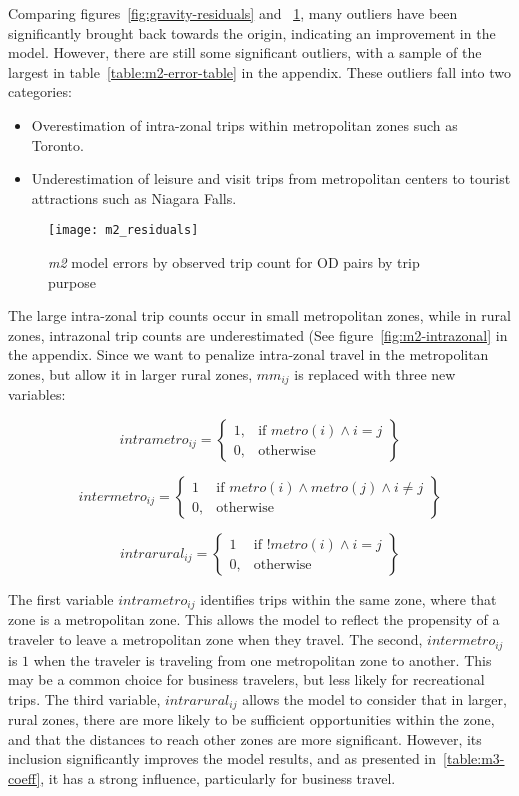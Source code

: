 Comparing figures~\ref{fig:gravity-residuals} and ~\ref{fig:m2_residuals}, many outliers have been significantly brought back towards the origin, indicating an improvement in the model. However, there are still some significant outliers, with a sample of the largest in table~\ref{table:m2-error-table} in the appendix. These outliers fall into two categories:
\begin{itemize}
\item Overestimation of intra-zonal trips within metropolitan zones such as Toronto.
\item Underestimation of leisure and visit trips from metropolitan centers to tourist attractions such as Niagara Falls.
\end{itemize}

\begin{figure}[H]
\centering
\texttt{[image: m2\_residuals]}
\caption{\textit{m2} model errors by observed trip count for OD pairs by trip purpose}
\label{fig:m2_residuals}
\end{figure}

The large intra-zonal trip counts occur in small metropolitan zones, while in rural zones, intrazonal trip counts are underestimated (See figure~\ref{fig:m2-intrazonal} in the appendix. Since we want to penalize intra-zonal travel in the metropolitan zones, but allow it in larger rural zones, $mm_{ij}$  is replaced with three new variables:

	$$	
	intrametro_{ij} = \left.
  \begin{cases}
    1, & \text{if } metro(i) \wedge i = j \\
    0, & \text{otherwise }
  \end{cases}
  \right\}
	$$
  
	$$	
	intermetro_{ij} = \left.
  \begin{cases}
    1 & \text{if } metro(i) \wedge metro(j) \wedge i \neq j \\
    0, & \text{otherwise } 
  \end{cases}
  \right\}
	$$  
	
	$$	
	intrarural_{ij} = \left.
  \begin{cases}
    1 & \text{if } !metro(i) \wedge i = j \\
    0, & \text{otherwise } 
  \end{cases}
  \right\}
	$$

The first variable $intrametro_{ij}$ identifies trips within the same zone, where that zone is a metropolitan zone. This allows the model to reflect the propensity of a traveler to leave a metropolitan zone when they travel. The second, $intermetro_{ij}$ is $1$ when the traveler is traveling from one metropolitan zone to another. This may be a common choice for business travelers, but less likely for recreational trips. The third variable, $intrarural_{ij}$ allows the model to consider that in larger, rural zones, there are more likely to be sufficient opportunities within the zone, and that the distances to reach other zones are more significant. However, its inclusion significantly improves the model results, and as presented in~\ref{table:m3-coeff}, it has a strong influence, particularly for business travel.

